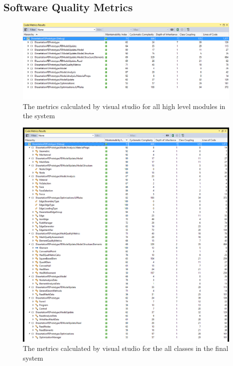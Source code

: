 \begin{changemargin}{\CMwidth}{\CMheight}
\section{Software Quality Metrics}


\begin{figure}
  \centerline{\includegraphics[width=165mm, scale=0.5]{../Graphics/softwareQualityMetrics.png}}
  \caption{The metrics calculated by visual studio for all high level modules in the system}
  \label{fig:boat1}
\end{figure}

\begin{figure}
  \centerline{\includegraphics[width=165mm, scale=0.5]{../Graphics/qualityMetricsExpanded.png}}
  \caption{The metrics calculated by visual studio for the all classes in the final system}
  \label{fig:boat1}
\end{figure}



\end{changemargin}
